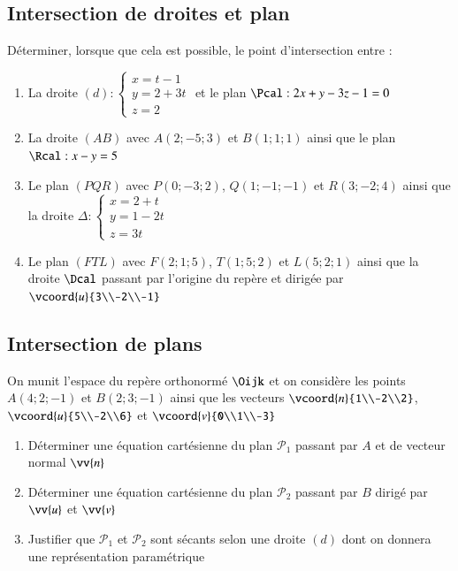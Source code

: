 \documentclass[oneside,12pt]{article}          %
\begin{document}
\subsection{Intersection de droites et plan}
Déterminer, lorsque que cela est possible, le point d'intersection entre :
\begin{enumerate}
	\item La droite $(d):\begin{cases}x=t-1\\y=2+3t\\z=2\end{cases}$ et le plan $\Pcal : 2x+y-3z-1=0$
	\item La droite $(AB)$ avec $A(2;-5;3)$ et $B(1;1;1)$ ainsi que le plan $\Rcal :x-y=5$
	\item Le plan $(PQR)$ avec $P(0;-3;2)$, $Q(1;-1;-1)$ et $R(3;-2;4)$ ainsi que la droite $\Delta :\begin{cases}x=2+t\\y=1-2t\\z=3t\end{cases}$
	\item Le plan $(FTL)$ avec $F(2;1;5)$, $T(1;5;2)$ et $L(5;2;1)$ ainsi que la droite $\Dcal$ passant par l'origine du repère et dirigée par $\vcoord{u}{3\\-2\\-1}$
\end{enumerate}



\subsection{Intersection de plans}
On munit l'espace du repère orthonormé $\Oijk$ et on considère les points $A(4;2;-1)$ et $B(2;3;-1)$ ainsi que les vecteurs $\vcoord{n}{1\\-2\\2}$, $\vcoord{u}{5\\-2\\6}$ et $\vcoord{v}{0\\1\\-3}$
    \begin{enumerate}
        \item Déterminer une équation cartésienne du plan $\mathscr{P}_1$ passant par $A$ et de vecteur normal $\vv{n}$
        \item Déterminer une équation cartésienne du plan $\mathscr{P}_2$ passant par $B$ dirigé par $\vv{u}$ et $\vv{v}$
        \item Justifier que $\mathscr{P}_1$ et $\mathscr{P}_2$ sont sécants selon une droite $(d)$ dont on donnera une représentation paramétrique     
    \end{enumerate}
\end{document}
